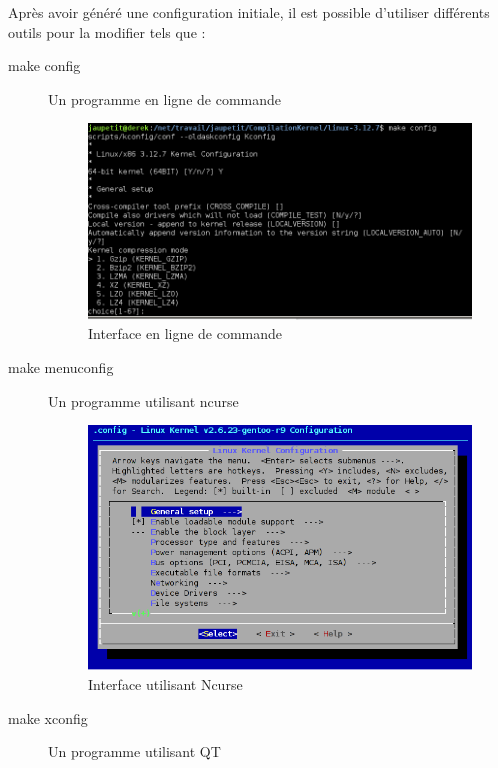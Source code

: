 \documentclass[16pts]{report}
\begin{document}
Après avoir généré une configuration initiale, il est possible d’utiliser
différents outils pour la modifier tels que :

\begin{description}
    \item[make config]      	Un programme en ligne de commande \\
        \begin{figure}[H]
            \includegraphics[scale=0.7]{illustrations/configLine.png} 
            \centering
            \caption{Interface en ligne de commande}
            \label{fig:MakeConfig}
        \end{figure}
        \pagebreak
    \item[make menuconfig]      Un programme utilisant ncurse \\

        \begin{figure}[H]
            \includegraphics[scale=0.7]{illustrations/menuconfig.png}
            \centering
            \caption{Interface utilisant Ncurse}
            \label{fig:MakeMenuConfig}
        \end{figure}
    \item[make xconfig]     	Un programme utilisant QT \\


\end{description}
\end{document}
